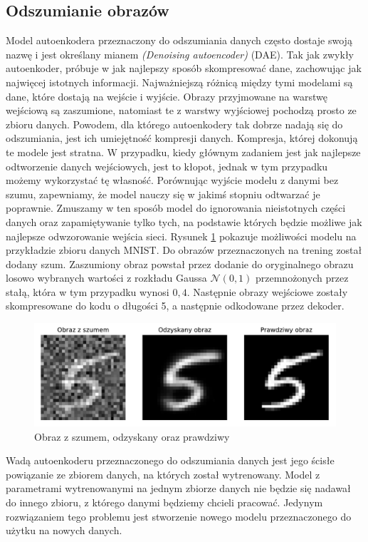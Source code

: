 \documentclass[a4paper,12pt,oneside]{book} %
\begin{document}
\subsection{Odszumianie obrazów}
Model autoenkodera przeznaczony do odszumiania danych często dostaje swoją nazwę i jest określany mianem \textit{(Denoising autoencoder)} (DAE). Tak jak zwykły autoenkoder, próbuje w jak najlepszy sposób skompresować dane, zachowując jak najwięcej istotnych informacji. Najważniejszą różnicą między tymi modelami są dane, które dostają na wejście i wyjście. Obrazy przyjmowane na warstwę wejściową są zaszumione, natomiast te z warstwy wyjściowej pochodzą prosto ze zbioru danych.
Powodem, dla którego autoenkodery tak dobrze nadają się do odszumiania, jest ich umiejętność kompresji danych. Kompresja, której dokonują te modele jest stratna. W przypadku, kiedy głównym zadaniem jest jak najlepsze odtworzenie danych wejściowych, jest to kłopot, jednak w tym przypadku możemy wykorzystać tę własność. Porównując wyjście modelu z danymi bez szumu, zapewniamy, że model nauczy się w jakimś stopniu odtwarzać je poprawnie. Zmuszamy w ten sposób model do ignorowania nieistotnych części danych oraz zapamiętywanie tylko tych, na podstawie których będzie możliwe jak najlepsze odwzorowanie wejścia sieci.
Rysunek \ref{fig:noisedae} pokazuje możliwości modelu na przykładzie zbioru danych MNIST. Do obrazów przeznaczonych na trening został dodany szum. Zaszumiony obraz powstał przez dodanie do oryginalnego obrazu losowo wybranych wartości z rozkładu Gaussa $\mathcal{N}(0,1)$ przemnożonych przez stałą, która w tym przypadku wynosi $0,4$. Następnie obrazy wejściowe zostały skompresowane do kodu o długości 5, a następnie odkodowane przez dekoder. 
\begin{figure}[h!]
	\centering\includegraphics[width=14.5cm]{denoisingae.pdf}
	\caption{Obraz z szumem, odzyskany oraz prawdziwy}
	\label{fig:noisedae}
\end{figure}

Wadą autoenkoderu przeznaczonego do odszumiania danych jest jego ścisłe powiązanie ze zbiorem danych, na których został wytrenowany. Model z parametrami wytrenowanymi na jednym zbiorze danych nie będzie się nadawał do innego zbioru, z którego danymi będziemy chcieli pracować. Jedynym rozwiązaniem tego problemu jest stworzenie nowego modelu przeznaczonego do użytku na nowych danych. 
\end{document}
